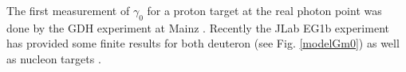 The first measurement of $\gamma_0$ for a proton target at the real photon point was done by the GDH experiment at Mainz  \cite{propE03_006}.
Recently the JLab EG1b experiment has provided some finite \qsqs results for both deuteron (see Fig. \ref{modelGm0}) as well as nucleon targets \cite{nGuler_th}. 
\begin{comment}
Some \chipts calculations \cite{KaoPV04} \cite{BEKM13} as well as phenomenological predictions  \cite{maid07} are also available and have been used to compare with the available measurments.

\begin{figure}[h]%
  \leavevmode \texttt{[image: TexmakerMyFinTh/Chap2Theory/Figures/integralsModelsDataNoEG4Gm0LowQ2.png]} 
  \caption[Predictions for $\gamma^d_0$ and some data]{Some theoretical predictions for $\gamma^d_1$ together with the recently measured EG1b data.}
  \label{modelGm0}  
\end{figure}
	
\end{comment}
